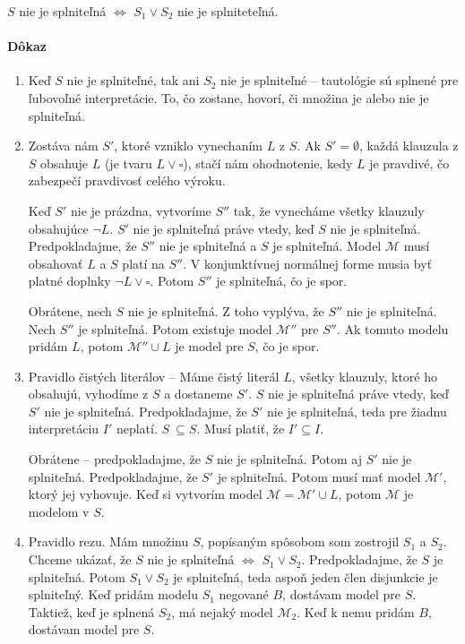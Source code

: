 $S$ nie je splniteľná $\iff$ $S_1 \lor S_2$ nie je splniteteľná.

\paragraph{Dôkaz}
\begin{enumerate}
	\item Keď $S$ nie je splniteľné, tak ani $S_2$ nie je splniteľné --
	tautológie sú splnené pre ľubovoľné interpretácie. To, čo zostane,
	hovorí, či množina je alebo nie je splniteľná.
	\item Zostáva nám $S'$, ktoré vzniklo vynechaním $L$ z $S$. Ak
	$S'=\emptyset$, každá klauzula z $S$ obsahuje $L$ (je tvaru $L \lor
	\square$), stačí nám ohodnotenie, kedy $L$ je pravdivé, čo zabezpečí
	pravdivosť celého výroku. 
	\par
	Keď $S'$ nie je prázdna, vytvoríme $S''$ tak,
	že vynecháme všetky klauzuly obsahujúce $\neg L$. $S'$ nie je splniteľná
	práve vtedy, keď $S$ nie je splniteľná. Predpokladajme, že $S''$ nie je
	splniteľná a $S$ je splniteľná. Model $\mathcal{M}$ musí obsahovať $L$ a
	$S$ platí na $S''$.
	V konjunktívnej normálnej forme musia byť platné doplnky $\neg L \lor
	\square$. Potom $S''$ je splniteľná, čo je spor.

	\par Obrátene, nech $S$ nie je splniteľná. Z toho vyplýva, že $S''$ nie
	je splniteľná. Nech $S''$ je splniteľná. Potom existuje model
	$\mathcal{M}''$ pre $S''$. Ak tomuto modelu pridám $L$, potom
	$\mathcal{M}'' \cup L$ je model pre $S$, čo je spor.

	\item Pravidlo čistých literálov -- Máme čistý literál $L$, všetky
	klauzuly, ktoré ho obsahujú, vyhodíme z $S$ a dostaneme $S'$. $S$ nie je
	splniteľná práve vtedy, keď $S'$ nie je splniteľná. Predpokladajme, že
	$S'$ nie je splniteľná, teda pre žiadnu interpretáciu $I'$ neplatí. $S\
	\subseteq S$. Musí platiť, že $I' \subseteq I$.

	\par Obrátene -- predpokladajme, že $S$ nie je splniteľná. Potom aj $S'$
	nie je splniteľná. Predpokladajme, že $S'$ je splniteľná. Potom musí mať
	model $\mathcal{M}'$, ktorý jej vyhovuje. Keď si vytvorím model
	$\mathcal{M}=\mathcal{M}'\cup L$, potom $\mathcal{M}$ je modelom v $S$.

	\item Pravidlo rezu. Mám množinu $S$, popísaným spôsobom som zostrojil
	$S_1$ a $S_2$. Chceme ukázať, že $S$ nie je splniteľná $\iff$ $S_1 \lor
	S_2$. Predpokladajme, že $S$ je splniteľná. Potom $S_1 \lor S_2$ je
	splniteľná, teda aspoň jeden člen disjunkcie je splniteľný. Keď pridám
	modelu $S_1$ negované $B$, dostávam model pre $S$. Taktiež, keď je
	splnená $S_2$, má nejaký model $\mathcal{M_2}$. Keď k nemu pridám $B$,
	dostávam model pre $S$.


\end{enumerate}
